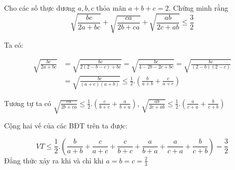 \begin{problem}
	Cho các số thực dương $a, b, c$ thỏa mãn $a + b + c = 2$. Chứng minh rằng
	$$
		\sqrt{\frac{bc}{2a + bc}} + \sqrt{\frac{ca}{2b + ca}} + \sqrt{\frac{ab}{2c + ab}}
		\le \frac{3}{2}
	$$

	\solution

	Ta có:

	\begin{align*}
		\sqrt{\frac{bc}{2a + bc}} &= \sqrt{\frac{bc}{2(2 - b - c) + bc}}
		= \sqrt{\frac{bc}{4 - 2b - 2c + bc}} = \sqrt{\frac{bc}{(2 - b)(2 - c)}} \\
		&= \sqrt{\frac{bc}{(a + c)(a + b)}} 
		\le \frac{1}{2}.\left(\frac{b}{a + b} + \frac{c}{a + c}\right)
	\end{align*}

	Tương tự ta có $\displaystyle \sqrt{\frac{ca}{2b + ca}} \le \frac{1}{2}.\left(\frac{c}{b + c} + \frac{a}{b + a}\right)$, $\displaystyle \sqrt{\frac{ab}{2c + ab}} \le \frac{1}{2}.\left(\frac{a}{c + a} + \frac{b}{c + b}\right)$

	Cộng hai vế của các BĐT trên ta được:

	$$
		VT \le \frac{1}{2}.\left(\frac{b}{a + b} + \frac{c}{a + c} + \frac{c}{b + c} + \frac{a}{b + a} + \frac{a}{c + a} + \frac{b}{c + b}\right) = \frac{3}{2}
	$$
	Đẳng thức xảy ra khi và chỉ khi $\displaystyle a = b = c = \frac{2}{3}$
\end{problem}

